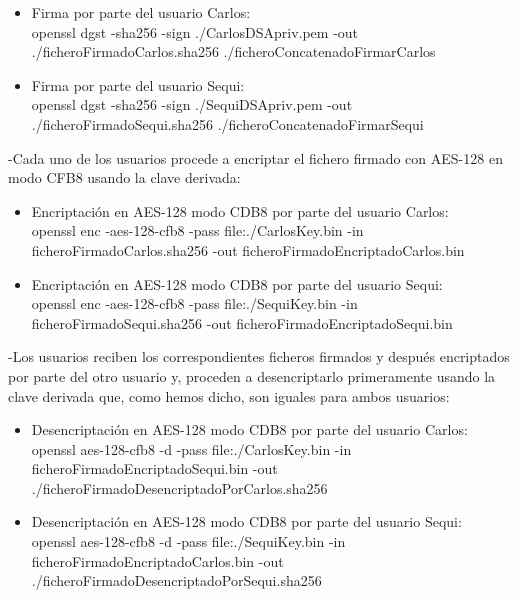\begin{itemize}
	\item Firma por parte del usuario Carlos: \\
	
	openssl dgst -sha256 -sign ./CarlosDSApriv.pem -out ./ficheroFirmadoCarlos.sha256 ./ficheroConcatenadoFirmarCarlos
	
	\item Firma por parte del usuario Sequi: \\
	
	openssl dgst -sha256 -sign ./SequiDSApriv.pem -out ./ficheroFirmadoSequi.sha256 ./ficheroConcatenadoFirmarSequi
\end{itemize}

-Cada uno de los usuarios procede a encriptar el fichero firmado con AES-128 en modo CFB8 usando la clave derivada:

\begin{itemize}
	\item Encriptación en AES-128 modo CDB8 por parte del usuario Carlos: \\
	
	openssl enc -aes-128-cfb8 -pass file:./CarlosKey.bin -in ficheroFirmadoCarlos.sha256 -out ficheroFirmadoEncriptadoCarlos.bin
	
	\item Encriptación en AES-128 modo CDB8 por parte del usuario Sequi: \\
	
	openssl enc -aes-128-cfb8 -pass file:./SequiKey.bin -in ficheroFirmadoSequi.sha256 -out ficheroFirmadoEncriptadoSequi.bin
\end{itemize}

-Los usuarios reciben los correspondientes ficheros firmados y después encriptados por parte del otro usuario y, proceden a desencriptarlo
primeramente usando la clave derivada que, como hemos dicho, son iguales para ambos usuarios:

\begin{itemize}
	\item Desencriptación en AES-128 modo CDB8 por parte del usuario Carlos: \\
	
	openssl aes-128-cfb8 -d -pass file:./CarlosKey.bin -in ficheroFirmadoEncriptadoSequi.bin -out ./ficheroFirmadoDesencriptadoPorCarlos.sha256
	
	\item Desencriptación en AES-128 modo CDB8 por parte del usuario Sequi: \\
	
	openssl aes-128-cfb8 -d -pass file:./SequiKey.bin -in ficheroFirmadoEncriptadoCarlos.bin -out ./ficheroFirmadoDesencriptadoPorSequi.sha256
\end{itemize}

